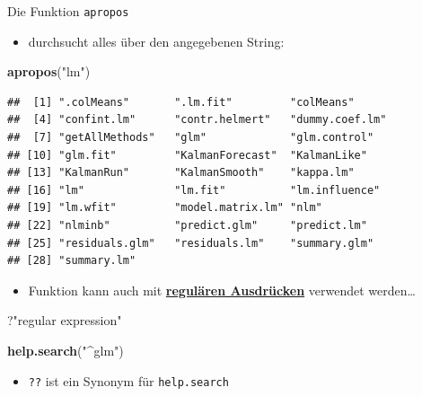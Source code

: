 \documentclass[ignorenonframetext,]{beamer}
\newenvironment{Shaded}{\begin{snugshade}}{\end{snugshade}}
\newcommand{\KeywordTok}[1]{\textcolor[rgb]{0.26,0.66,0.93}{\textbf{#1}}}
\newcommand{\StringTok}[1]{\textcolor[rgb]{0.02,0.61,0.04}{#1}}
\newcommand{\NormalTok}[1]{\textcolor[rgb]{0.74,0.68,0.62}{#1}}
\providecommand{\tightlist}{%
  \setlength{\itemsep}{0pt}\setlength{\parskip}{0pt}}
\begin{document}
\begin{frame}[fragile]{Die Funktion \texttt{apropos}}

\begin{itemize}
\tightlist
\item
  durchsucht alles über den angegebenen String:
\end{itemize}

\begin{Shaded}
\begin{Highlighting}[]
\KeywordTok{apropos}\NormalTok{(}\StringTok{"lm"}\NormalTok{)}
\end{Highlighting}
\end{Shaded}

\begin{verbatim}
##  [1] ".colMeans"       ".lm.fit"         "colMeans"       
##  [4] "confint.lm"      "contr.helmert"   "dummy.coef.lm"  
##  [7] "getAllMethods"   "glm"             "glm.control"    
## [10] "glm.fit"         "KalmanForecast"  "KalmanLike"     
## [13] "KalmanRun"       "KalmanSmooth"    "kappa.lm"       
## [16] "lm"              "lm.fit"          "lm.influence"   
## [19] "lm.wfit"         "model.matrix.lm" "nlm"            
## [22] "nlminb"          "predict.glm"     "predict.lm"     
## [25] "residuals.glm"   "residuals.lm"    "summary.glm"    
## [28] "summary.lm"
\end{verbatim}

\begin{itemize}
\tightlist
\item
  Funktion kann auch mit
  \href{https://de.wikipedia.org/wiki/Regul\%C3\%A4rer_Ausdruck}{\textbf{regulären
  Ausdrücken}} verwendet werden\ldots{}
\end{itemize}

\begin{Shaded}
\begin{Highlighting}[]
\NormalTok{?}\StringTok{"regular expression"}
\end{Highlighting}
\end{Shaded}

\begin{Shaded}
\begin{Highlighting}[]
\KeywordTok{help.search}\NormalTok{(}\StringTok{"^glm"}\NormalTok{)}
\end{Highlighting}
\end{Shaded}

\begin{itemize}
\tightlist
\item
  \texttt{??} ist ein Synonym für \texttt{help.search}
\end{itemize}

\end{frame}
\end{document}
